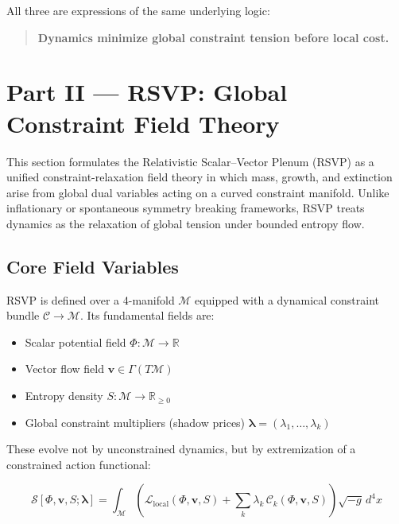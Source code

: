\documentclass[11pt,a4paper]{article}
\begin{document}
All three are expressions of the same underlying logic:

\begin{quote}
\textbf{Dynamics minimize global constraint tension before local cost.}
\end{quote}

\clearpage
\section{Part II — RSVP: Global Constraint Field Theory}

This section formulates the Relativistic Scalar–Vector Plenum (RSVP) as a unified constraint-relaxation field theory in which mass, growth, and extinction arise from global dual variables acting on a curved constraint manifold. Unlike inflationary or spontaneous symmetry breaking frameworks, RSVP treats dynamics as the relaxation of global tension under bounded entropy flow.

\subsection{Core Field Variables}

RSVP is defined over a 4-manifold \( \mathcal{M} \) equipped with a dynamical constraint bundle \( \mathcal{C} \to \mathcal{M} \). Its fundamental fields are:

\begin{itemize}
    \item Scalar potential field \( \Phi : \mathcal{M} \to \mathbb{R} \)
    \item Vector flow field \( \mathbf{v} \in \Gamma(T\mathcal{M}) \)
    \item Entropy density \( S : \mathcal{M} \to \mathbb{R}_{\ge 0} \)
    \item Global constraint multipliers (shadow prices) \( \boldsymbol{\lambda} = (\lambda_1,\dots,\lambda_k) \)
\end{itemize}

These evolve not by unconstrained dynamics, but by extremization of a constrained action functional:

\begin{equation}
\mathcal{S}[\Phi,\mathbf{v},S;\boldsymbol{\lambda}]
= \int_{\mathcal{M}} \left(
\mathcal{L}_{\text{local}}(\Phi,\mathbf{v},S)
+ \sum_{k} \lambda_k \, \mathcal{C}_k(\Phi,\mathbf{v},S)
\right)\sqrt{-g}\, d^4x
\end{equation}
\end{document}
